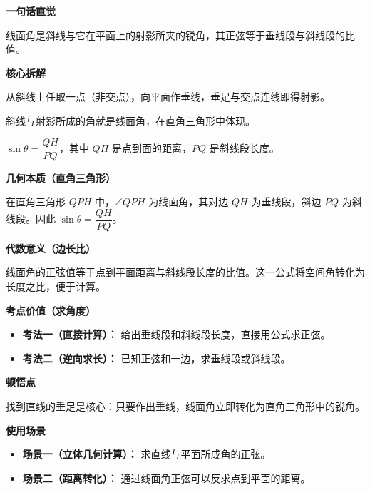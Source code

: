 \begin{explanationbox}

	\textbf{\textcolor{CExplanation}{一句话直觉}}

	线面角是斜线与它在平面上的射影所夹的锐角，其正弦等于垂线段与斜线段的比值。

	\medskip
	\textbf{\textcolor{CExplanation}{核心拆解}}
	\begin{description}[style=nextline, leftmargin=2.8em, labelsep=0.5em, itemsep=0.45em]
		\item[\textbf{要点一（构造垂线）：}] 从斜线上任取一点（非交点），向平面作垂线，垂足与交点连线即得射影。
		\item[\textbf{要点二（确定角）：}] 斜线与射影所成的角就是线面角，在直角三角形中体现。
		\item[\textbf{要点三（正弦公式）：}] $\sin\theta = \dfrac{QH}{PQ}$，其中 $QH$ 是点到面的距离，$PQ$ 是斜线段长度。
	\end{description}

	\medskip
	\textbf{\textcolor{CExplanation}{几何本质（直角三角形）}}

	在直角三角形 $QPH$ 中，$\angle QPH$ 为线面角，其对边 $QH$ 为垂线段，斜边 $PQ$ 为斜线段。因此 $\sin\theta = \dfrac{QH}{PQ}$。

	\medskip
	\textbf{\textcolor{CExplanation}{代数意义（边长比）}}

	线面角的正弦值等于点到平面距离与斜线段长度的比值。这一公式将空间角转化为长度之比，便于计算。

	\medskip
	\textbf{\textcolor{CExplanation}{考点价值（求角度）}}
	\begin{itemize}[leftmargin=*, itemsep=0.5em, topsep=0.4em]
		\item \textbf{考法一（直接计算）：} 给出垂线段和斜线段长度，直接用公式求正弦。
		\item \textbf{考法二（逆向求长）：} 已知正弦和一边，求垂线段或斜线段。
	\end{itemize}

	\medskip
	\textbf{\textcolor{CExplanation}{顿悟点}}

	找到直线的垂足是核心：只要作出垂线，线面角立即转化为直角三角形中的锐角。

	\medskip
	\textbf{\textcolor{CExplanation}{使用场景}}
	\begin{itemize}[leftmargin=*, itemsep=0.5em, topsep=0.4em]
		\item \textbf{场景一（立体几何计算）：} 求直线与平面所成角的正弦。
		\item \textbf{场景二（距离转化）：} 通过线面角正弦可以反求点到平面的距离。
	\end{itemize}
\end{explanationbox}
